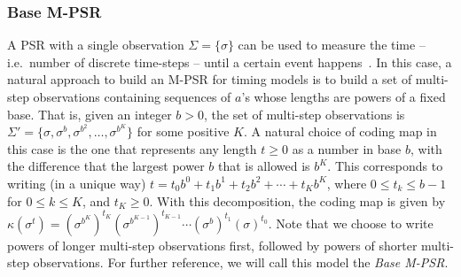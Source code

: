 \documentclass[letterpaper]{article}
\begin{document}
\subsubsection{Base M-PSR}
A PSR with a single observation $\Sigma = \{\sigma\}$ can be used to measure the time -- i.e.\ number of discrete time-steps -- until a certain event happens~\cite{ODM}. In this case, a natural approach to build an M-PSR for timing models is to build a set of multi-step observations containing sequences of $a$'s whose lengths are powers of a fixed base. That is, given an integer $b > 0$, the set of multi-step observations is $\Sigma' = \{\sigma,\sigma^b, \sigma^{b^2}, \ldots, \sigma^{b^K}\}$ for some positive $K$. A natural choice of coding map in this case is the one that represents any length $t \geq 0$ as a number in base $b$, with the difference that the largest power $b$ that is allowed is $b^K$. This corresponds to writing (in a unique way) $t = t_0 b^0 + t_1 b^1 + t_2 b^2 + \cdots + t_K b^K$, where $0 \leq t_k \leq b - 1$ for $0 \leq k \leq K$, and $t_K \geq 0$. With this decomposition, the coding map is given by $\kappa(\sigma^t) = (\sigma^{b^K})^{t_K} (\sigma^{b^{K-1}})^{t_{K-1}} \cdots (\sigma^b)^{t_1} (\sigma)^{t_0}$. Note that we choose to write powers of longer multi-step observations first, followed by powers of shorter multi-step observations. For further reference, we will call this model the \emph{Base M-PSR}.
\end{document}
